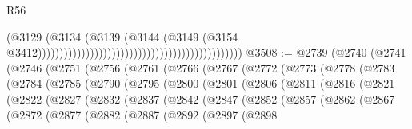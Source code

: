 \begin{lexlean}{R56}
\begin{coremodule}
                                                                                      (@3129
                                                                                        (@3134
                                                                                          (@3139
                                                                                            (@3144
                                                                                              (@3149
                                                                                                (@3154
                                                                                                  @3412)))))))))))))))))))))))))))))))))))))))))))))))
@3508 := @2739
    (@2740
      (@2741
        (@2746
          (@2751
            (@2756
              (@2761
                (@2766
                  (@2767
                    (@2772
                      (@2773
                        (@2778
                          (@2783
                            (@2784
                              (@2785
                                (@2790
                                  (@2795
                                    (@2800
                                      (@2801
                                        (@2806
                                          (@2811
                                            (@2816
                                              (@2821
                                                (@2822
                                                  (@2827
                                                    (@2832
                                                      (@2837
                                                        (@2842
                                                          (@2847
                                                            (@2852
                                                              (@2857
                                                                (@2862
                                                                  (@2867
                                                                    (@2872
                                                                      (@2877
                                                                        (@2882
                                                                          (@2887
                                                                            (@2892
                                                                              (@2897
                                                                                (@2898

\end{coremodule}
\end{lexlean}

